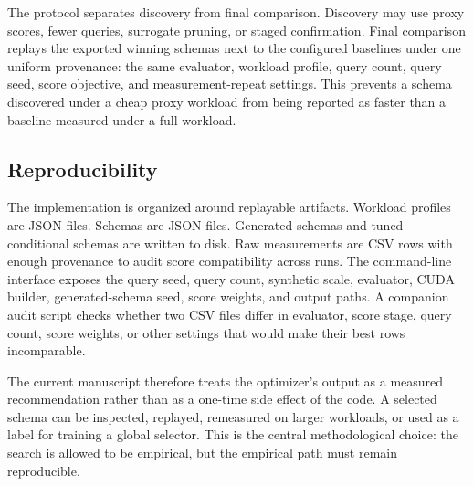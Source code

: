 The protocol separates discovery from final comparison. Discovery may use proxy scores, fewer queries, surrogate pruning, or staged confirmation. Final comparison replays the exported winning schemas next to the configured baselines under one uniform provenance: the same evaluator, workload profile, query count, query seed, score objective, and measurement-repeat settings. This prevents a schema discovered under a cheap proxy workload from being reported as faster than a baseline measured under a full workload.

\subsection{Reproducibility}

The implementation is organized around replayable artifacts. Workload profiles are JSON files. Schemas are JSON files. Generated schemas and tuned conditional schemas are written to disk. Raw measurements are CSV rows with enough provenance to audit score compatibility across runs. The command-line interface exposes the query seed, query count, synthetic scale, evaluator, CUDA builder, generated-schema seed, score weights, and output paths. A companion audit script checks whether two CSV files differ in evaluator, score stage, query count, score weights, or other settings that would make their best rows incomparable.

The current manuscript therefore treats the optimizer's output as a measured recommendation rather than as a one-time side effect of the code. A selected schema can be inspected, replayed, remeasured on larger workloads, or used as a label for training a global selector. This is the central methodological choice: the search is allowed to be empirical, but the empirical path must remain reproducible.
